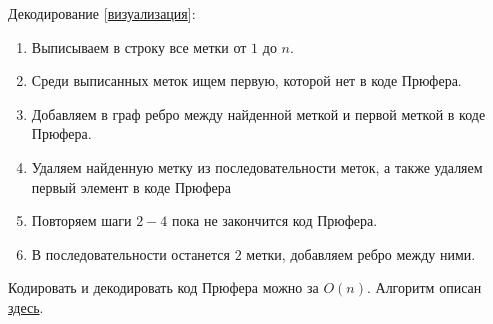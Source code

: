 Декодирование
[\href{https://www.youtube.com/watch?v=7s44l7gWEVk}{визуализация}]:
\begin{enumerate}
  \item Выписываем в строку все метки от \(1\) до \(n\).
  \item Среди выписанных меток ищем первую, которой нет в коде Прюфера.
  \item Добавляем в граф ребро между найденной меткой и первой меткой в коде
  Прюфера.
  \item Удаляем найденную метку из последовательности меток, а также удаляем
  первый элемент в коде Прюфера
  \item Повторяем шаги \(2-4\) пока не закончится код Прюфера.
  \item В последовательности останется \(2\) метки, добавляем ребро между ними.
\end{enumerate}

\begin{remark}
  Кодировать и декодировать код Прюфера можно за \(O(n)\). Алгоритм описан
  \href{https://www.scirp.org/pdf/JSEA20090200006_93737200.pdf}{здесь}.
\end{remark}
